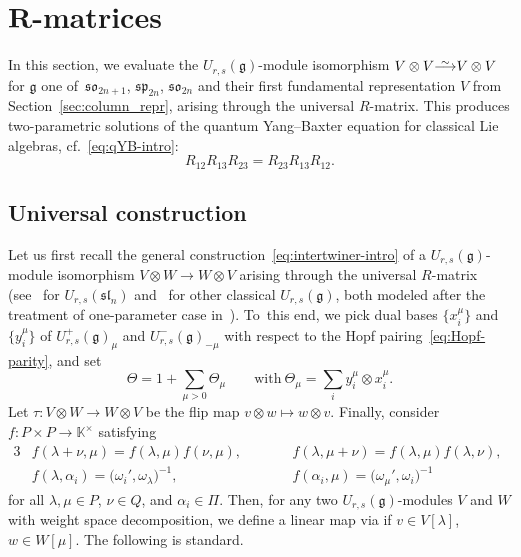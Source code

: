 \documentclass[pdftex]{sigma}
\numberwithin{equation}{section}
\newcommand{\fg}{\mathfrak{g}}
\newcommand{\ssl}{\mathfrak{sl}}
\newcommand{\sso}{\mathfrak{so}}
\newcommand{\ssp}{\mathfrak{sp}}
\newcommand{\uu}{U_{r,s}(\fg)}
\newcommand\iso{ \vphantom{j^{X^2}}\smash{\overset{\sim}{\vphantom{\rule{0pt}{0.20em}}\smash{\longrightarrow}}} }
\begin{document}
\section[R-matrices]{$\boldsymbol{R}$-matrices}\label{sec:R-matrices}

In this section, we evaluate the $\uu$-module isomorphism $V \otimes V \iso V \otimes V$ for $\fg$ one of~$\sso_{2n + 1}$, $\ssp_{2n}$, $\sso_{2n}$ and their first fundamental representation $V$ from Section~\ref{sec:column_repr}, arising through the universal $R$-matrix. This produces two-parametric solutions of the quantum Yang--Baxter equation for classical Lie algebras, cf.\ \eqref{eq:qYB-intro}:
\begin{equation}\label{eq:qYB}
 R_{12}R_{13}R_{23}=R_{23}R_{13}R_{12}.
\end{equation}

\subsection{Universal construction}\label{ssec:universal-R}

Let us first recall the general construction~\eqref{eq:intertwiner-intro} of a $\uu$-module isomorphism $V \otimes W \to W \otimes V$ arising through the universal $R$-matrix (see~\cite[Section~4]{BW1} for $U_{r,s}(\ssl_n)$ and~\cite[Section~3]{BGH2} for other classical $U_{r,s}(\fg)$, both modeled after the treatment of one-parameter case in~\cite[Section~7]{J}). To~this end, we pick dual bases $\bigl\{x_{i}^{\mu}\bigr\}$ and $\bigl\{y_{i}^{\mu}\bigr\}$ of $U^{+}_{r,s}(\fg)_{\mu}$ and $U^{-}_{r,s}(\fg)_{-\mu}$ with respect to the Hopf pairing~\eqref{eq:Hopf-parity}, and set
\begin{equation}\label{eq:Theta}
 \Theta = 1 + \sum_{\mu > 0}\Theta_{\mu} \qquad \text{with} \
 \Theta_{\mu} = \sum_{i} y_{i}^{\mu} \otimes x_{i}^{\mu}.
\end{equation}
Let $\tau\colon V \otimes W \to W \otimes V$ be the flip map $v \otimes w \mapsto w \otimes v$.
Finally, consider $f\colon P \times P \to \mathbb{K}^{\times}$ satisfying
\begin{alignat}{3}
 &f(\lambda + \nu,\mu) = f(\lambda,\mu)f(\nu,\mu), \qquad&&
 f(\lambda,\mu + \nu) = f(\lambda,\mu)f(\lambda,\nu) , &\nonumber \\
 &f(\lambda,\alpha_{i}) = \bigl(\omega_{i}',\omega_{\lambda}\bigr)^{-1}, \qquad&&
 f(\alpha_{i},\mu) = \bigl(\omega_{\mu}',\omega_{i}\bigr)^{-1}&\label{eq:f}
\end{alignat}
for all $\lambda,\mu \in P$, $\nu \in Q$, and $\alpha_{i} \in \Pi$. Then, for any two $\uu$-modules $V$ and $W$ with weight space decomposition, we define a linear map  via  if $v \in V[\lambda]$, $w \in W[\mu]$. The following is standard.
\end{document}
